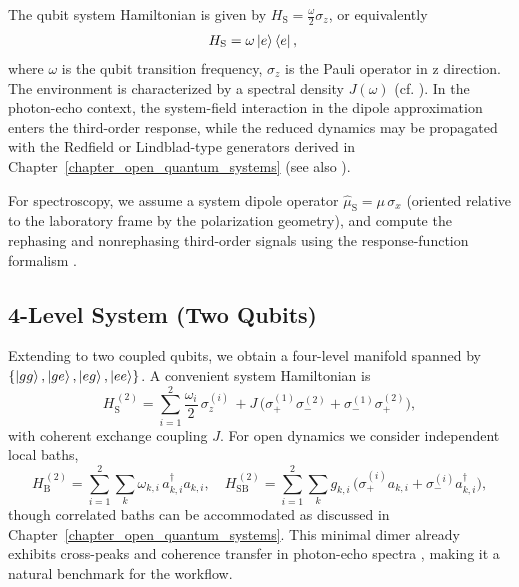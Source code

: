 The qubit system Hamiltonian is given by $H_{\mathrm{S}} = \frac{\omega}{2} \sigma_z$, or equivalently
\begin{align}
	H_{\mathrm{S}} & = \omega \ket{e}\bra{e} ,
	\label{eq:qubit_system}
\end{align}
where $\omega$ is the qubit transition frequency, $\sigma_z$ is the Pauli operator in z direction.
The environment is characterized by a spectral density $J(\omega)$ (cf. \cite{breuerpetruccione2009theoryopenquantum,ritscheleisfeld2014analyticrepresentationsbath}). In the photon-echo context, the system-field interaction in the dipole approximation enters the third-order response, while the reduced dynamics may be propagated with the Redfield or Lindblad-type generators derived in Chapter~\ref{chapter_open_quantum_systems} (see also \cite{campaiolietal2024quantummasterequations,manzano2020shortintroductionlindblad}).

For spectroscopy, we assume a system dipole operator $\hat{\mu}_{\mathrm{S}} = \mu\,\sigma_x$ (oriented relative to the laboratory frame by the polarization geometry), and compute the rephasing and nonrephasing third-order signals using the response-function formalism \cite{mukamel1995principlesnonlinearoptical,jonas2003twodimensionalfemtosecondspectroscopy}.


\subsection{4-Level System (Two Qubits)}

Extending to two coupled qubits, we obtain a four-level manifold spanned by $\{\ket{gg},\ket{ge},\ket{eg},\ket{ee}\}$. A convenient system Hamiltonian is
\begin{equation}
	H_{\mathrm{S}}^{\,(2)} = \sum_{i=1}^{2} \frac{\omega_i}{2}\, \sigma_z^{(i)}
	\,+ J\,\bigl( \sigma_{+}^{(1)}\sigma_{-}^{(2)} + \sigma_{-}^{(1)}\sigma_{+}^{(2)} \bigr),
	\label{eq:two_qubit_system}
\end{equation}
with coherent exchange coupling $J$. For open dynamics we consider independent local baths,
\begin{equation}
	H_{\mathrm{B}}^{\,(2)} = \sum_{i=1}^{2} \sum_{k} \omega_{k,i}\, a_{k,i}^{\dagger} a_{k,i},
	\quad
	H_{\mathrm{SB}}^{\,(2)} = \sum_{i=1}^{2} \sum_{k} g_{k,i}\,\bigl( \sigma_{+}^{(i)} a_{k,i} + \sigma_{-}^{(i)} a_{k,i}^{\dagger} \bigr),
	\label{eq:two_qubit_bath}
\end{equation}
though correlated baths can be accommodated as discussed in Chapter~\ref{chapter_open_quantum_systems}. This minimal dimer already exhibits cross-peaks and coherence transfer in photon-echo spectra \cite{pisliakovetal2006twodimensionalopticalthreepulse}, making it a natural benchmark for the workflow.

